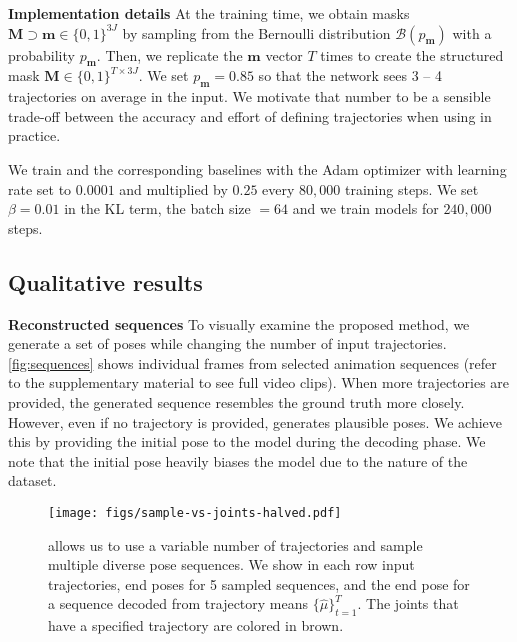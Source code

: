 \documentclass[10pt,twocolumn,letterpaper]{article}
\renewcommand{\hat}[1]{\widehat{#1}}
\renewcommand{\paragraph}[1]{\noindent\textbf{#1}\enskip}
\begin{document}
\paragraph{Implementation details}
At the training time, we obtain masks $\mathbf{M} \supset \mathbf{m}\in \{0, 1\}^{3J}$ by sampling from the Bernoulli
distribution $\mathcal{B}(p_\mathbf{m})$ with a probability $p_\mathbf{m}$. Then, we replicate the $\mathbf{m}$ vector $T$ times to create the structured mask $\mathbf{M} \in \{0, 1\}^{T \times 3J} $. 
We set $p_\mathbf{m} = 0.85$ so that the network sees 3 -- 4 trajectories on average in the input. We motivate that number to be a sensible trade-off between the accuracy and effort of defining trajectories when using \trajevae{} in practice.

We train \trajevae{} and the corresponding baselines with the Adam optimizer
\cite{kingma2014adam} with learning rate set to $0.0001$ and multiplied by $0.25$ every
$80,000$ training steps. We set $\beta=0.01$ in the KL term, the batch size $= 64$ and we train models for $240,000$ steps.


\subsection{Qualitative results}

\paragraph{Reconstructed sequences} To visually examine the proposed method, we generate a set of poses while
changing the number of input trajectories. \cref{fig:sequences} shows individual frames from selected animation sequences (refer to the supplementary material to see full video clips). When more trajectories are provided, the generated sequence resembles the ground truth more closely. However, even if no trajectory is provided, \trajevae{} generates
plausible poses. We achieve this by providing the initial pose to the model during the decoding phase. We note that the initial pose heavily biases the model due to the nature of the dataset. 


\begin{figure}[t!]
    \centering
    \texttt{[image: figs/sample-vs-joints-halved.pdf]}
    \caption{\trajevae{} allows us to use a variable number of trajectories and sample multiple diverse pose sequences. We show in each row input trajectories, end poses for 5 sampled sequences, and the end pose for a sequence decoded from trajectory means $\{\hat{\mu}\}^T_{t=1}$. The joints that have a specified trajectory are colored in brown.}
    \label{fig:sample-vs-joints}
    \vspace{-0.5em}
\end{figure}
\end{document}
